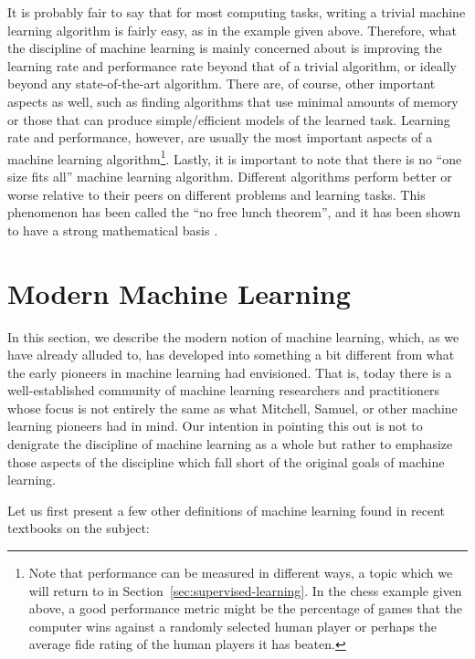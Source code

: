 It is probably fair to say that for most computing tasks, writing a trivial machine learning algorithm is fairly easy, as in the example given above. Therefore, what the discipline of machine learning is mainly concerned about is improving the learning rate and performance rate beyond that of a trivial algorithm, or ideally beyond any state-of-the-art algorithm. There are, of course, other important aspects as well, such as finding algorithms that use minimal amounts of memory or those that can produce simple/efficient models of the learned task. Learning rate and performance, however, are usually the most important aspects of a machine learning algorithm\footnote{Note that performance can be measured in different ways, a topic which we will return to in Section~\ref{sec:supervised-learning}. %
In the chess example given above, a good performance metric might be the percentage of games that the computer wins against a randomly selected human player or perhaps the average \gls{fide} rating of the human players it has beaten.}. Lastly, it is important to note that there is no ``one size fits all'' machine learning algorithm. Different algorithms perform better or worse relative to their peers on different problems and learning tasks. This phenomenon has been called the ``no free lunch theorem'', and it has been shown to have a strong mathematical basis \cite{wolpert1996lack}.

\section{Modern Machine Learning}
\label{sec:modern-machine-learning}

In this section, we describe the modern notion of machine learning, which, as we have already alluded to, has developed into something a bit different from what the early pioneers in machine learning had envisioned. That is, today there is a well-established community of machine learning researchers and practitioners whose focus is not entirely the same as what Mitchell, Samuel, or other machine learning pioneers had in mind. Our intention in pointing this out is not to denigrate the discipline of machine learning as a whole but rather to emphasize those aspects of the discipline which fall short of the original goals of machine learning. 

Let us first present a few other definitions of machine learning found in recent textbooks on the subject:

